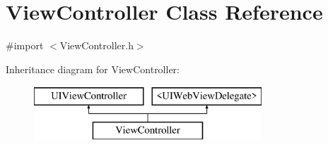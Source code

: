 \hypertarget{interface_view_controller}{\section{View\-Controller Class Reference}
\label{interface_view_controller}
}


{\ttfamily \#import $<$View\-Controller.\-h$>$}

Inheritance diagram for View\-Controller\-:\begin{figure}[H]
\begin{center}
\leavevmode
\includegraphics[height=2.000000cm]{interface_view_controller}
\end{center}
\end{figure}
